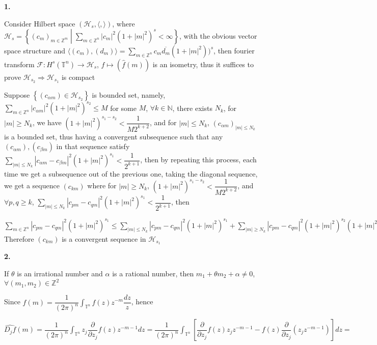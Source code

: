 \documentclass[../main.tex]{subfiles}
\begin{document}
\textbf{1.} \par
Consider Hilbert space $(\mathcal{H}_s,\langle,\rangle)$, where $\displaystyle\mathcal{H}_s=\left\{(c_m)_{m\in\mathbb{Z}^m}\middle\vert\sum_{m\in\mathbb{Z}^n}|c_m|^2(1+|m|^2)^s<\infty\right\}$, with the obvious vector space structure and $\displaystyle\langle (c_m),(d_m)\rangle=\sum_{m\in\mathbb{Z}^n}c_m\overline{d_m}(1+|m|^2))^s$, then fourier transform $\mathcal{F}:H^s(\mathbb{T}^n)\rightarrow\mathcal{H}_s$, $f\mapsto (\widehat{f}(m))$ is an isometry, thus it suffices to prove $\mathcal{H}_{s_2}\Rightarrow\mathcal{H}_{s_1}$ is compact \par
Suppose $\left\{(c_{\alpha m})\in \mathcal{H}_{s_2}\right\}$ is bounded set, namely, $\displaystyle\sum_{m\in\mathbb{Z}^n}|c_{\alpha m}|^2(1+|m|^2)^{s_2}\leq M$ for some $M$, $\forall k\in\mathbb{N}$, there exists $N_k$, for $|m|\geq N_k$, we have $(1+|m|^2)^{s_1-s_2}<\dfrac{1}{M2^{k+2}}$, and for $|m|\leq N_k$, $(c_{\alpha m})_{|m|\leq N_k}$ is a bounded set, thus having a convergent subsequence such that any $(c_{\alpha m}),(c_{\beta m})$ in that sequence satisfy $\displaystyle\sum_{|m|\leq N_k}|c_{\alpha m}-c_{\beta m}|^2(1+|m|^2)^{s_1}<\dfrac{1}{2^{k+1}}$, then by repeating this process, each time we get a subsequence out of the previous one, taking the diagonal sequence, we get a sequence $(c_{km})$ where for $|m|\geq N_k$, $(1+|m|^2)^{s_1-s_2}<\dfrac{1}{M2^{k+2}}$, and $\forall p,q\geq k$, $\displaystyle\sum_{|m|\leq N_k}|c_{pm}-c_{qm}|^2(1+|m|^2)^{s_1}<\dfrac{1}{2^{k+1}}$, then \par
$\displaystyle\sum_{m\in\mathbb{Z}^n}|c_{pm}-c_{qm}|^2(1+|m|^2)^{s_1}\leq\sum_{|m|\leq N_k}|c_{pm}-c_{qm}|^2(1+|m|^2)^{s_1}+\sum_{|m|\geq N_k}|c_{pm}-c_{qm}|^2(1+|m|^2)^{s_2}(1+|m|^2)^{s_1-s_2}<\dfrac{1}{2^{k+1}}+\dfrac{1}{M2^{k+2}}\sum_{m\in\mathbb{Z}^n}|c_{pm}-c_{qm}|^2(1+|m|^2)^{s_2}<\dfrac{1}{2^k}$
Therefore $(c_{km})$ is a convergent sequence in $\mathcal{H}_{s_1}$ \par
\textbf{2.} \par
If $\theta$ is an irrational number and $\alpha$ is a rational number, then $m_1+\theta m_2+\alpha\neq0$, $\forall(m_1,m_2)\in\mathbb{Z}^2$ \par
Since $\displaystyle\widehat{f}(m)=\dfrac{1}{(2\pi)^n}\int_{\mathbb{T}^n}f(z)z^{-m}\dfrac{dz}{z}$, hence \par
$\displaystyle\widehat{D_jf}(m)=\dfrac{1}{(2\pi)^n}\int_{\mathbb{T}^n}z_j\dfrac{\partial}{\partial z_j}f(z)z^{-m-1}dz=\dfrac{1}{(2\pi)^n}\int_{\mathbb{T}^n}\left[\dfrac{\partial}{\partial z_j}f(z)z_jz^{-m-1}-f(z)\dfrac{\partial}{\partial z_j}(z_jz^{-m-1})\right]dz=$ \par
\end{document}
